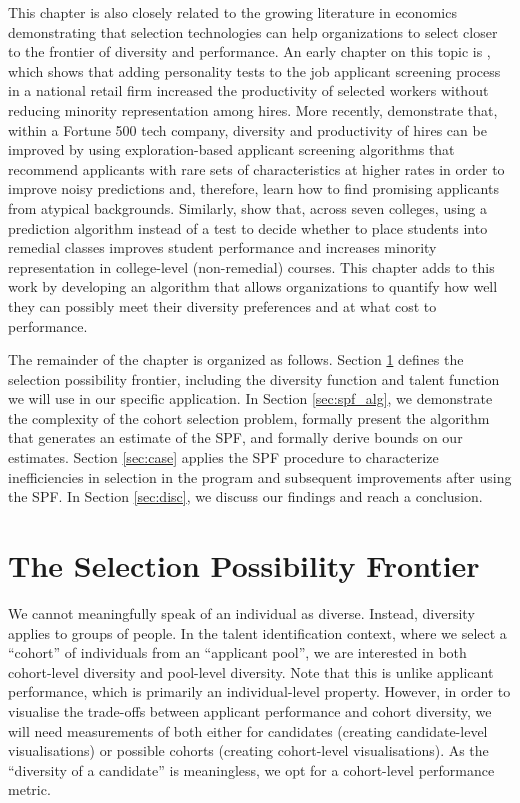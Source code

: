 This chapter is also closely related to the growing literature in economics demonstrating that selection technologies can help organizations to select closer to the frontier of diversity and performance. An early chapter on this topic is \textcite{autor2008does}, which shows that adding personality tests to the job applicant screening process in a national retail firm increased the productivity of selected workers without reducing minority representation among hires. More recently, \textcite{li2020hiring} demonstrate that,  within a Fortune 500 tech company, diversity and productivity of hires can be improved by using exploration-based applicant screening algorithms that recommend applicants with rare sets of characteristics at higher rates in order to improve noisy predictions and, therefore, learn how to find promising applicants from atypical backgrounds. Similarly, \textcite{bergman2021seven} show that, across seven colleges, using a prediction algorithm instead of a test to decide whether to place students into remedial classes improves student performance and increases minority representation in college-level (non-remedial) courses. This chapter adds to this work by developing an algorithm that allows organizations to quantify how well they can possibly meet their diversity preferences and at what cost to performance. 

The remainder of the chapter is organized as follows. Section \ref{sec:spf_def} defines the selection possibility frontier, including the diversity function and talent function we will use in our specific application. In Section \ref{sec:spf_alg}, we demonstrate the complexity of the cohort selection problem, formally present the algorithm that generates an estimate of the SPF, and formally derive bounds on our estimates. Section \ref{sec:case} applies the SPF procedure to characterize inefficiencies in selection in the program and subsequent improvements after using the SPF. In Section \ref{sec:disc}, we discuss our findings and reach a conclusion. 

\section{The Selection Possibility Frontier}\label{sec:spf_def}
We cannot meaningfully speak of an individual as diverse. Instead, diversity applies to groups of people. In the talent identification context, where we select a ``cohort'' of individuals from an ``applicant pool'', we are interested in both cohort-level diversity and pool-level diversity. Note that this is unlike applicant performance, which is primarily an individual-level property. However, in order to visualise the trade-offs between applicant performance and cohort diversity, we will need measurements of both either for candidates (creating candidate-level visualisations) or possible cohorts (creating cohort-level visualisations). As the ``diversity of a candidate'' is meaningless, we opt for a cohort-level performance metric.

